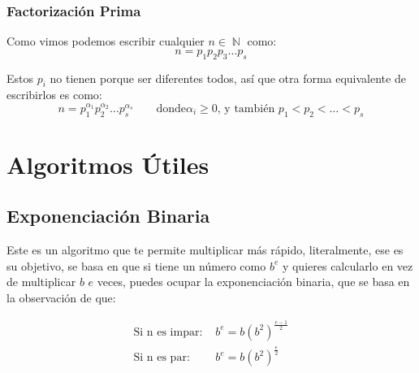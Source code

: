 \documentclass[12pt, fleqn]{report}                             %
\DeclareMathOperator \Space {\quad}                             %
\DeclareMathOperator \Naturals  {\mathbb{N}}                     %
\begin{document}
        \subsection{Factorización Prima}

            Como vimos podemos escribir cualquier $n \in \Naturals$ como:
            \begin{equation}
                n = p_1 p_2 p_3 \dots p_s
            \end{equation}

            Estos $p_i$ no tienen porque ser diferentes todos, así que 
            otra forma equivalente de escribirlos es como:
            \begin{equation}
                n = p_1^{\alpha_1}p_2^{\alpha_2} \dots p_s^{\alpha_s}
                \Space
                \text{ donde}
                \alpha_i \geq 0 \text{, y también } p_1 < p_2 < \dots < p_s
            \end{equation}








\chapter{Algoritmos Útiles}
    \clearpage

    \section{Exponenciación Binaria}

        Este es un algoritmo que te permite multiplicar más rápido, literalmente, ese es 
        su objetivo, se basa en que si tiene un número como $b^e$ y quieres calcularlo
        en vez de multiplicar $b$ $e$ veces, puedes ocupar la exponenciación binaria, 
        que se basa en la observación de que:

        \begin{equation}
        \begin{split}
            \text{Si n es impar: }  &   b^e = b (b^2)^{\frac{e-1}{2}}   \\
            \text{Si n es par: }    &   b^e = b (b^2)^{\frac{e}{2}}
        \end{split}
        \end{equation}
\end{document}

